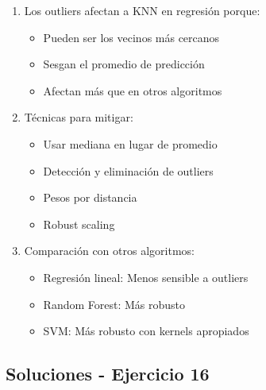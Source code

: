 \documentclass[12pt]{article}
\begin{document}
\begin{enumerate}
    \item Los outliers afectan a KNN en regresión porque:
    \begin{itemize}
        \item Pueden ser los vecinos más cercanos
        \item Sesgan el promedio de predicción
        \item Afectan más que en otros algoritmos
    \end{itemize}
    \item Técnicas para mitigar:
    \begin{itemize}
        \item Usar mediana en lugar de promedio
        \item Detección y eliminación de outliers
        \item Pesos por distancia
        \item Robust scaling
    \end{itemize}
    \item Comparación con otros algoritmos:
    \begin{itemize}
        \item Regresión lineal: Menos sensible a outliers
        \item Random Forest: Más robusto
        \item SVM: Más robusto con kernels apropiados
    \end{itemize}
\end{enumerate}

\subsection{Soluciones - Ejercicio 16}
\end{document}
